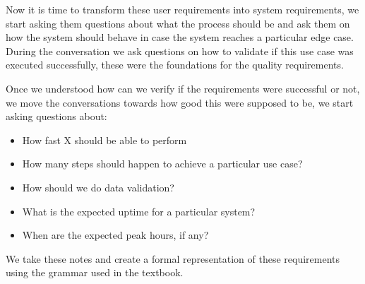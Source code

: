 \noindent Now it is time to transform these user requirements into system 
requirements, we start asking them questions about what the process should be 
and ask them on how the system should behave in case the system reaches a 
particular edge case. During the conversation we ask questions on how to 
validate if this use case was executed successfully, these were the 
foundations for the quality requirements.

\noindent Once we understood how can we verify if the requirements were 
successful or not, we move the conversations towards how good this were 
supposed to be, we start asking questions about:
\begin{itemize}
    \item How fast X should be able to perform
    \item How many steps should happen to achieve a particular use case?
    \item How should we do data validation?
    \item What is the expected uptime for a particular system?
    \item When are the expected peak hours, if any?
\end{itemize}

\noindent We take these notes and create a formal representation of these requirements 
using the grammar used in the textbook.




